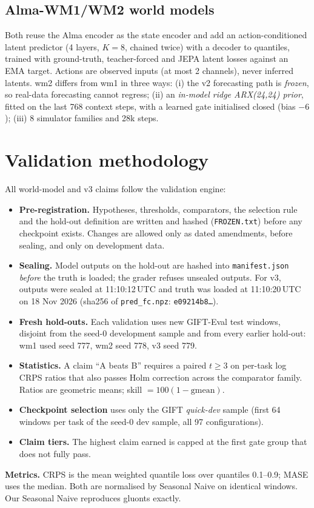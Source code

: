 \documentclass[10pt,a4paper]{extarticle}
\newcommand{\code}[1]{\texttt{\small #1}}
\begin{document}
\subsection{Alma-WM1/WM2 world models}
Both reuse the Alma encoder as the state encoder and add an action-conditioned latent predictor (4 layers, $K=8$, chained
twice) with a decoder to quantiles, trained with ground-truth, teacher-forced and JEPA latent losses against an EMA target.
Actions are observed inputs (at most 2 channels), never inferred latents. wm2 differs from wm1 in three ways: (i) the v2
forecasting path is \emph{frozen}, so real-data forecasting cannot regress; (ii) an \emph{in-model ridge ARX(24,24) prior},
fitted on the last 768 context steps, with a learned gate initialised closed (bias $-6$); (iii) 8 simulator families and 28k steps.

\section{Validation methodology}
\label{sec:method}
All world-model and v3 claims follow the validation engine:
\begin{itemize}
\item \textbf{Pre-registration.} Hypotheses, thresholds, comparators, the selection rule and the hold-out definition are
written and hashed (\code{FROZEN.txt}) before any checkpoint exists. Changes are allowed only as dated amendments, before
sealing, and only on development data.
\item \textbf{Sealing.} Model outputs on the hold-out are hashed into \code{manifest.json} \emph{before} the truth is loaded;
the grader refuses unsealed outputs. For v3, outputs were sealed at 11:10:12\,UTC and truth was loaded at 11:10:20\,UTC on
18 Nov 2026 (sha256 of \code{pred\_fc.npz}: \code{e09214b8\ldots}).
\item \textbf{Fresh hold-outs.} Each validation uses new GIFT-Eval test windows, disjoint from the seed-0 development sample
and from every earlier hold-out: wm1 used seed 777, wm2 seed 778, v3 seed 779.
\item \textbf{Statistics.} A claim ``A beats B'' requires a paired $t\ge3$ on per-task log CRPS ratios that also passes Holm
correction across the comparator family. Ratios are geometric means; skill $=100(1-\text{gmean})$.
\item \textbf{Checkpoint selection} uses only the GIFT \emph{quick-dev} sample (first 64 windows per task of the seed-0 dev
sample, all 97 configurations).
\item \textbf{Claim tiers.} The highest claim earned is capped at the first gate group that does not fully pass.
\end{itemize}
\textbf{Metrics.} CRPS is the mean weighted quantile loss over quantiles 0.1--0.9; MASE uses the median. Both are normalised
by Seasonal Naive on identical windows. Our Seasonal Naive reproduces gluonts exactly.
\end{document}
